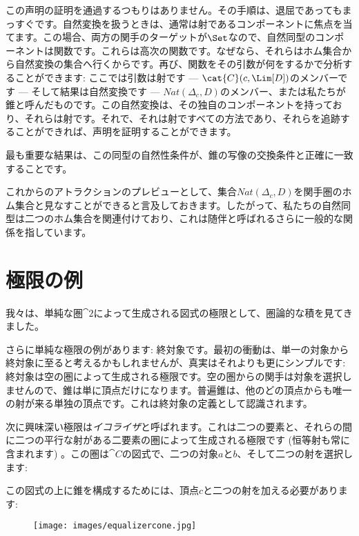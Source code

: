 この声明の証明を通過するつもりはありません。その手順は、退屈であってもまっすぐです。自然変換を扱うときは、通常は射であるコンポーネントに焦点を当てます。この場合、両方の関手のターゲットが$\Set$なので、自然同型のコンポーネントは関数です。これらは高次の関数です。なぜなら、それらはホム集合から自然変換の集合へ行くからです。再び、関数をその引数が何をするかで分析することができます: ここでは引数は射です --- $\cat{C}(c, \Lim[D])$のメンバーです --- そして結果は自然変換です --- $\mathit{Nat}(\Delta_c, D)$のメンバー、または私たちが錐と呼んだものです。この自然変換は、その独自のコンポーネントを持っており、それらは射です。それで、それは射ですべての方法であり、それらを追跡することができれば、声明を証明することができます。

最も重要な結果は、この同型の自然性条件が、錐の写像の交換条件と正確に一致することです。

これからのアトラクションのプレビューとして、集合$\mathit{Nat}(\Delta_c, D)$を関手圏のホム集合と見なすことができると言及しておきます。したがって、私たちの自然同型は二つのホム集合を関連付けており、これは随伴と呼ばれるさらに一般的な関係を指しています。

\section{極限の例}

我々は、単純な圏$\cat{2}$によって生成される図式の極限として、圏論的な積を見てきました。

さらに単純な極限の例があります: 終対象です。最初の衝動は、単一の対象から終対象に至ると考えるかもしれませんが、真実はそれよりも更にシンプルです: 終対象は空の圏によって生成される極限です。空の圏からの関手は対象を選択しませんので、錐は単に頂点だけになります。普遍錐は、他のどの頂点からも唯一の射が来る単独の頂点です。これは終対象の定義として認識されます。

次に興味深い極限は\emph{イコライザ}と呼ばれます。これは二つの要素と、それらの間に二つの平行な射がある二要素の圏によって生成される極限です (恒等射も常に含まれます) 。この圏は$\cat{C}$の図式で、二つの対象$a$と$b$、そして二つの射を選択します: 


この図式の上に錐を構成するためには、頂点$c$と二つの射を加える必要があります: 


\begin{figure}[H]
  \centering
  \texttt{[image: images/equalizercone.jpg]}
\end{figure}

